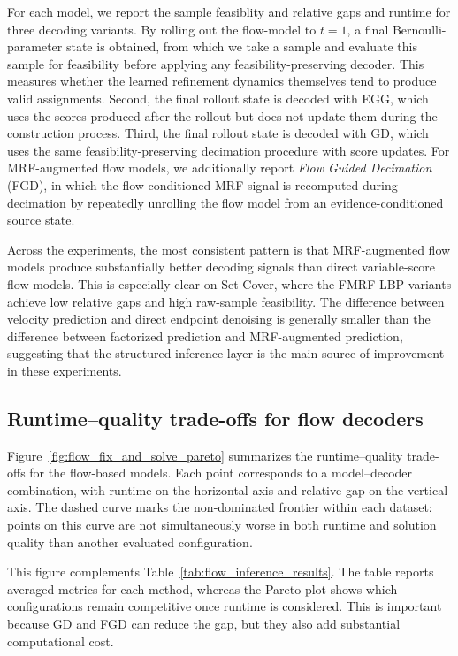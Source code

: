 For each model, we report the sample feasiblity and relative gaps and runtime for three decoding variants. By rolling out the flow-model to $t=1$, a final Bernoulli-parameter state is obtained, from which we take a sample and evaluate this sample for feasibility before applying any feasibility-preserving decoder. This measures whether the learned refinement dynamics themselves tend to produce valid assignments. Second, the final rollout state is decoded with EGG, which uses the scores produced after the rollout but does not update them during the construction process. Third, the final rollout state is decoded with GD, which uses the same feasibility-preserving decimation procedure with score updates. For MRF-augmented flow models, we additionally report \emph{Flow Guided Decimation} (FGD), in which the flow-conditioned MRF signal is recomputed during decimation by repeatedly unrolling the flow model from an evidence-conditioned source state.

Across the experiments, the most consistent pattern is that MRF-augmented flow models produce substantially better decoding signals than direct variable-score flow models. This is especially clear on Set Cover, where the FMRF-LBP variants achieve low relative gaps and high raw-sample feasibility. The difference between velocity prediction and direct endpoint denoising is generally smaller than the difference between factorized prediction and MRF-augmented prediction, suggesting that the structured inference layer is the main source of improvement in these experiments.



\subsection{Runtime--quality trade-offs for flow decoders}


Figure~\ref{fig:flow_fix_and_solve_pareto} summarizes the runtime--quality trade-offs for the flow-based models. Each point corresponds to a model--decoder combination, with runtime on the horizontal axis and relative gap on the vertical axis. The dashed curve marks the non-dominated frontier within each dataset: points on this curve are not simultaneously worse in both runtime and solution quality than another evaluated configuration.

This figure complements Table~\ref{tab:flow_inference_results}. The table reports averaged metrics for each method, whereas the Pareto plot shows which configurations remain competitive once runtime is considered. This is important because GD and FGD can reduce the gap, but they also add substantial computational cost.

